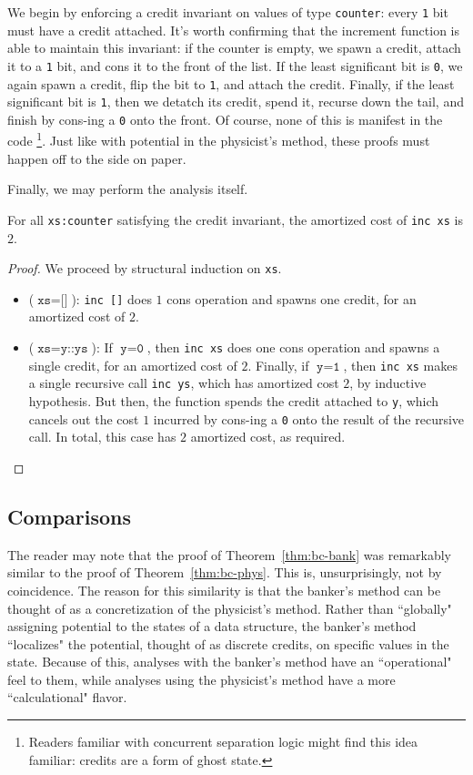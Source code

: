 We begin by enforcing a credit invariant on values of type \texttt{counter}: every \texttt{1} bit must have a credit attached. It's worth confirming that the increment function is able to maintain this invariant: if the counter is empty, we spawn a credit, attach it to a \texttt{1} bit, and cons it to the front of the list.
If the least significant bit is \texttt{0}, we again spawn a credit, flip the bit to \texttt{1}, and attach the credit. Finally, if the least significant bit is \texttt{1}, then we detatch its credit, spend it, recurse down the tail, and finish by cons-ing a \texttt{0} onto the front. Of course, none of this is manifest in the code
\footnote{
Readers familiar with concurrent separation logic might find this idea familiar: credits are a form of ghost state.
}.
Just like with potential in the physicist's method, these proofs must happen off to the side on paper.

Finally, we may perform the analysis itself.

\begin{theorem}
For all \texttt{xs:counter} satisfying the credit invariant, the amortized cost of \texttt{inc xs} is $2$.
\end{theorem}
\label{thm:bc-bank}
\begin{proof}
We proceed by structural induction on \texttt{xs}.
\begin{itemize}
  \item ($\texttt{xs} = \texttt{[]}$): \texttt{inc []} does $1$ cons operation and spawns one credit, for an amortized cost of $2$.
  \item ($\texttt{xs} = \texttt{y::ys}$): If $\texttt{y} = \texttt{0}$, then \texttt{inc xs} does one cons operation and spawns a single credit, for an amortized cost of $2$. Finally, if $\texttt{y} = \texttt{1}$, then \texttt{inc xs} makes a single recursive call \texttt{inc ys}, which has amortized cost $2$, by inductive hypothesis. But then, the function spends the credit attached to \texttt{y}, which cancels out the cost $1$ incurred by cons-ing a \texttt{0} onto the result of the recursive call. In total, this case has $2$ amortized cost, as required.
\end{itemize}
\end{proof}

\subsection{Comparisons}

The reader may note that the proof of Theorem~\ref{thm:bc-bank} was remarkably similar to the proof of Theorem~\ref{thm:bc-phys}. This is, unsurprisingly, not by coincidence. The reason for this similarity is that the banker's method can be thought of as a concretization of the physicist's method. Rather than ``globally" assigning potential to the states of a data structure, the banker's method ``localizes" the potential, thought of as discrete credits, on  specific values in the state. Because of this, analyses with the banker's method have an ``operational" feel to them, while analyses using the physicist's method have a more ``calculational" flavor.

